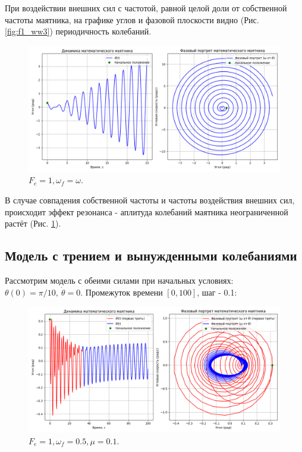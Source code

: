 При воздействии внешних сил с частотой, равной целой доли от собственной частоты маятника, на графике углов и фазовой плоскости видно (Рис. \ref{fig:f1_ww3}) периодичность колебаний.

\begin{figure}[h]  %
	\centering
	\includegraphics[width=1\textwidth]{imgs/f1ww.png}  %
	\caption{$F_e = 1, \omega_f = \omega$.}  %
	\label{fig:f1_ww}  %
\end{figure}

В случае совпадения собственной частоты и частоты воздействия внешних сил, происходит эффект резонанса - аплитуда колебаний маятника неограниченной растёт (Рис. \ref{fig:f1_ww}).
\newpage
\subsection*{Модель с трением и вынужденными колебаниями}
Рассмотрим модель с обеими силами при начальных условиях: $\theta(0) = \pi /10, \ \dot{\theta} = 0$. Промежуток времени $[0,100]$, шаг - 0.1:
\begin{figure}[h]  %
	\centering
	\includegraphics[width=1\textwidth]{imgs/f1w05mu01.png}  %
	\caption{$F_e = 1, \omega_f = 0.5, \mu = 0.1$.}  %
	\label{fig:f1_w05_mu01}  %
\end{figure}


